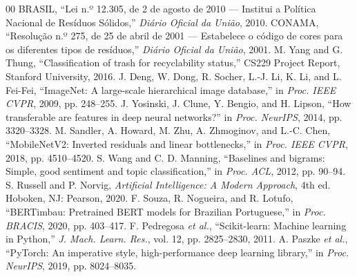 \documentclass[conference]{IEEEtran}
\begin{document}
\begin{thebibliography}{00}
 BRASIL, ``Lei n.º 12.305, de 2 de agosto de 2010 --- Institui a Política Nacional de Resíduos Sólidos,'' \emph{Diário Oficial da União}, 2010.
 CONAMA, ``Resolução n.º 275, de 25 de abril de 2001 --- Estabelece o código de cores para os diferentes tipos de resíduos,'' \emph{Diário Oficial da União}, 2001.
 M. Yang and G. Thung, ``Classification of trash for recyclability status,'' CS229 Project Report, Stanford University, 2016.
 J. Deng, W. Dong, R. Socher, L.-J. Li, K. Li, and L. Fei-Fei, ``ImageNet: A large-scale hierarchical image database,'' in \emph{Proc. IEEE CVPR}, 2009, pp. 248--255.
 J. Yosinski, J. Clune, Y. Bengio, and H. Lipson, ``How transferable are features in deep neural networks?'' in \emph{Proc. NeurIPS}, 2014, pp. 3320--3328.
 M. Sandler, A. Howard, M. Zhu, A. Zhmoginov, and L.-C. Chen, ``MobileNetV2: Inverted residuals and linear bottlenecks,'' in \emph{Proc. IEEE CVPR}, 2018, pp. 4510--4520.
 S. Wang and C. D. Manning, ``Baselines and bigrams: Simple, good sentiment and topic classification,'' in \emph{Proc. ACL}, 2012, pp. 90--94.
 S. Russell and P. Norvig, \emph{Artificial Intelligence: A Modern Approach}, 4th ed. Hoboken, NJ: Pearson, 2020.
 F. Souza, R. Nogueira, and R. Lotufo, ``BERTimbau: Pretrained BERT models for Brazilian Portuguese,'' in \emph{Proc. BRACIS}, 2020, pp. 403--417.
 F. Pedregosa \emph{et al.}, ``Scikit-learn: Machine learning in Python,'' \emph{J. Mach. Learn. Res.}, vol. 12, pp. 2825--2830, 2011.
 A. Paszke \emph{et al.}, ``PyTorch: An imperative style, high-performance deep learning library,'' in \emph{Proc. NeurIPS}, 2019, pp. 8024--8035.
\end{thebibliography}
\end{document}
